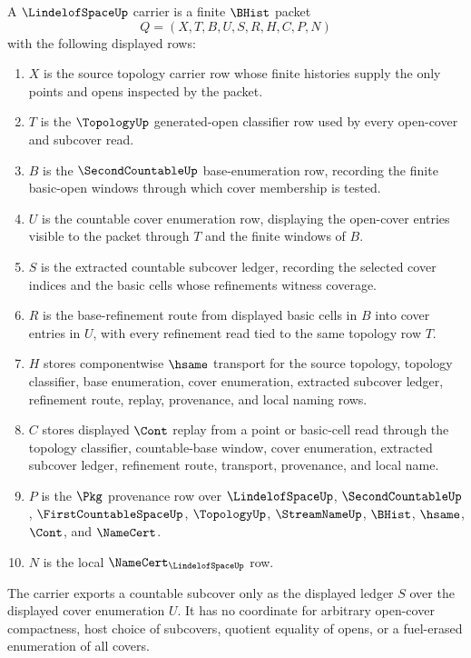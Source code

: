 \begin{definition}
\label{def:lindelof-space-carrier}
A $\LindelofSpaceUp$ carrier is a finite $\BHist$ packet
$$
Q=(X,T,B,U,S,R,H,C,P,N)
$$
with the following displayed rows:
\begin{enumerate}
\item $X$ is the source topology carrier row whose finite histories supply the only points and opens inspected by the packet.
\item $T$ is the $\TopologyUp$ generated-open classifier row used by every open-cover and subcover read.
\item $B$ is the $\SecondCountableUp$ base-enumeration row, recording the finite basic-open windows through which cover membership is tested.
\item $U$ is the countable cover enumeration row, displaying the open-cover entries visible to the packet through $T$ and the finite windows of $B$.
\item $S$ is the extracted countable subcover ledger, recording the selected cover indices and the basic cells whose refinements witness coverage.
\item $R$ is the base-refinement route from displayed basic cells in $B$ into cover entries in $U$, with every refinement read tied to the same topology row $T$.
\item $H$ stores componentwise $\hsame$ transport for the source topology, topology classifier, base enumeration, cover enumeration, extracted subcover ledger, refinement route, replay, provenance, and local naming rows.
\item $C$ stores displayed $\Cont$ replay from a point or basic-cell read through the topology classifier, countable-base window, cover enumeration, extracted subcover ledger, refinement route, transport, provenance, and local name.
\item $P$ is the $\Pkg$ provenance row over $\LindelofSpaceUp$, $\SecondCountableUp$, $\FirstCountableSpaceUp$, $\TopologyUp$, $\StreamNameUp$, $\BHist$, $\hsame$, $\Cont$, and $\NameCert$.
\item $N$ is the local $\NameCert_{\LindelofSpaceUp}$ row.
\end{enumerate}
The carrier exports a countable subcover only as the displayed ledger $S$ over the displayed cover enumeration $U$. It has no coordinate for arbitrary open-cover compactness, host choice of subcovers, quotient equality of opens, or a fuel-erased enumeration of all covers.
\end{definition}

